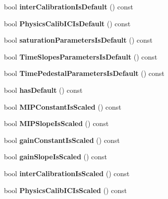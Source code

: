 \begin{DoxyCompactItemize}
\item 
bool {\bfseries interCalibrationIsDefault} () const \label{classCALICE_1_1Ahc2CalibrationStatusBits_aa90445a6de7f1f35b3e8e1ffe34299a9}

\item 
bool {\bfseries PhysicsCalibICIsDefault} () const \label{classCALICE_1_1Ahc2CalibrationStatusBits_a5cee89c4a70a9e196bae203818920bc4}

\item 
bool {\bfseries saturationParametersIsDefault} () const \label{classCALICE_1_1Ahc2CalibrationStatusBits_a838584c262cfbccea7969744e968e563}

\item 
bool {\bfseries TimeSlopesParametersIsDefault} () const \label{classCALICE_1_1Ahc2CalibrationStatusBits_a84bb230b2a5a83cc168640aef3675027}

\item 
bool {\bfseries TimePedestalParametersIsDefault} () const \label{classCALICE_1_1Ahc2CalibrationStatusBits_a1f1ec182447b2628a06d9b1f287cd9a1}

\item 
bool {\bfseries hasDefault} () const \label{classCALICE_1_1Ahc2CalibrationStatusBits_abc660f877930fa42c2e8527dcff5d2d7}

\item 
bool {\bfseries MIPConstantIsScaled} () const \label{classCALICE_1_1Ahc2CalibrationStatusBits_a7c8965a803ecec5750d1c230d3276ce9}

\item 
bool {\bfseries MIPSlopeIsScaled} () const \label{classCALICE_1_1Ahc2CalibrationStatusBits_a5ab7245b3e09f28776a5456796e7fa2e}

\item 
bool {\bfseries gainConstantIsScaled} () const \label{classCALICE_1_1Ahc2CalibrationStatusBits_a4590015de61eadec69155b6f052785ef}

\item 
bool {\bfseries gainSlopeIsScaled} () const \label{classCALICE_1_1Ahc2CalibrationStatusBits_a0f661aabae4ebbc614e5cd64f5494997}

\item 
bool {\bfseries interCalibrationIsScaled} () const \label{classCALICE_1_1Ahc2CalibrationStatusBits_a05d6c638e0e7f499f8b767deba52b7ef}

\item 
bool {\bfseries PhysicsCalibICIsScaled} () const \label{classCALICE_1_1Ahc2CalibrationStatusBits_a9cd5210e7e5a264e30965e2014d9eedc}


\end{DoxyCompactItemize}
